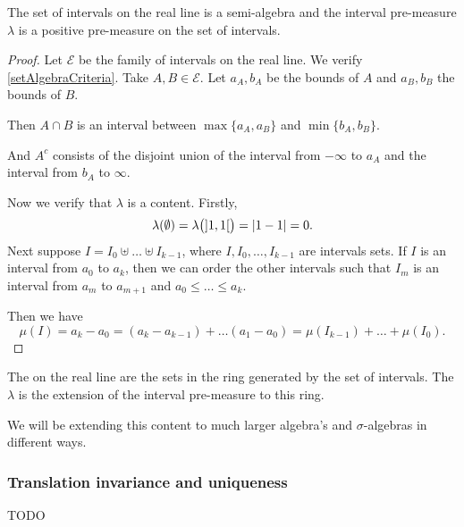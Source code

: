 \begin{lemma}
The set of intervals on the real line is a semi-algebra and the interval pre-measure $\lambda$ is a positive pre-measure on the set of intervals.
\end{lemma}
\begin{proof}
Let $\mathcal{E}$ be the family of intervals on the real line. We verify \ref{setAlgebraCriteria}. Take $A,B\in \mathcal{E}$. Let $a_A,b_A$ be the bounds of $A$ and $a_B, b_B$ the bounds of $B$.

Then $A\cap B$ is an interval between $\max\{a_A, a_B\}$ and $\min\{b_A, b_B\}$.

And $A^c$ consists of the disjoint union of the interval from $-\infty$ to $a_A$ and the interval from $b_A$ to $\infty$.

Now we verify that $\lambda$ is a content. Firstly,
\[ \lambda(\emptyset) = \lambda\big(\interval[o]{1,1}\big) = |1-1| = 0. \]
Next suppose $I = I_0\uplus \ldots \uplus I_{k-1}$, where $I,I_0,\ldots, I_{k-1}$ are intervals sets. If $I$ is an interval from $a_0$ to $a_k$, then we can order the other intervals such that $I_m$ is an interval from $a_m$ to $a_{m+1}$ and $a_0 \leq \ldots \leq a_k$.

Then we have
\[ \mu(I) = a_k - a_0 = (a_k - a_{k-1}) + \ldots (a_1 - a_0) = \mu(I_{k-1}) + \ldots + \mu(I_0). \]
\end{proof}

\begin{definition}
The  on the real line are the sets in the ring generated by the set of intervals. The  $\lambda$ is the extension of the interval pre-measure to this ring.
\end{definition}

We will be extending this content to much larger algebra's and $\sigma$-algebras in different ways.

\subsubsection{Translation invariance and uniqueness}
TODO

